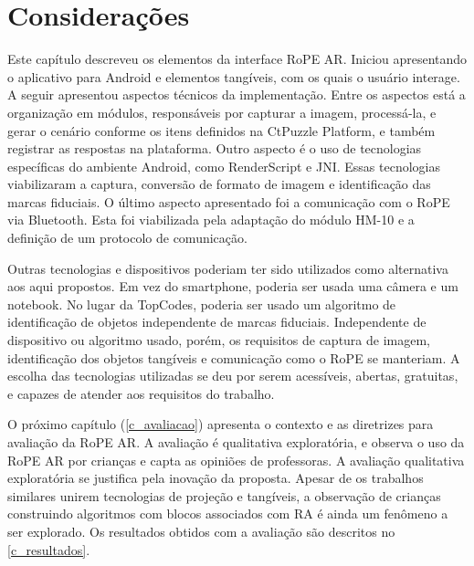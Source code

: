 \section{Considerações}

Este capítulo descreveu os elementos da interface RoPE AR. Iniciou apresentando o aplicativo para Android e elementos tangíveis, com os quais o usuário interage. A seguir apresentou aspectos técnicos da implementação. Entre os aspectos está a organização em módulos, responsáveis por capturar a imagem, processá-la, e gerar o cenário conforme os itens definidos na CtPuzzle Platform, e também registrar as respostas na plataforma. Outro aspecto é o uso de tecnologias específicas do ambiente Android, como RenderScript e JNI. Essas tecnologias viabilizaram a captura, conversão de formato de imagem e identificação das marcas fiduciais. O último aspecto apresentado foi a comunicação com o RoPE via Bluetooth. Esta foi viabilizada pela adaptação do módulo HM-10 e a definição de um protocolo de comunicação.

Outras tecnologias e dispositivos poderiam ter sido utilizados como alternativa aos aqui propostos. Em vez do smartphone, poderia ser usada uma câmera e um notebook. No lugar da TopCodes, poderia ser usado um algoritmo de identificação de objetos independente de marcas fiduciais. Independente de dispositivo ou algoritmo usado, porém, os requisitos de captura de imagem, identificação dos objetos tangíveis e comunicação como o RoPE se manteriam. A escolha das tecnologias utilizadas se deu por serem acessíveis, abertas, gratuitas, e capazes de atender aos requisitos do trabalho.

O próximo capítulo (\autoref{c_avaliacao}) apresenta o contexto e as diretrizes para avaliação da RoPE AR. A avaliação é qualitativa exploratória, e observa o uso da RoPE AR por crianças e capta as opiniões de professoras. A avaliação qualitativa exploratória se justifica pela inovação da proposta. Apesar de os trabalhos similares unirem tecnologias de projeção e tangíveis, a observação de crianças construindo algoritmos com blocos associados com \ac{RA} é ainda um fenômeno a ser explorado. Os resultados obtidos com a avaliação são descritos no \autoref{c_resultados}.